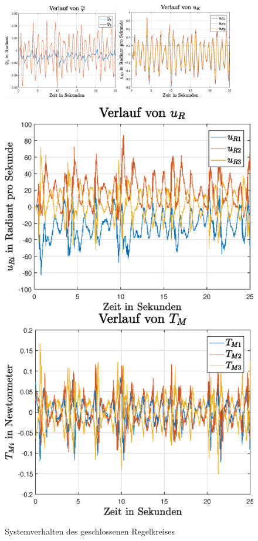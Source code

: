 \begin{figure}[h!]
\centering
\includegraphics[width=0.45\textwidth]{img/exp1_phi.eps}\hspace{0.7cm}
\includegraphics[width=0.45\textwidth]{img/exp1_uk.eps}
\vspace{0.5cm}

\includegraphics[width=0.45\linewidth]{img/exp1_ur.eps}\hspace{0.7cm}
\includegraphics[width=0.45\linewidth]{img/exp1_tm.eps}
\caption{Systemverhalten des geschlossenen Regelkreises}
\end{figure}

